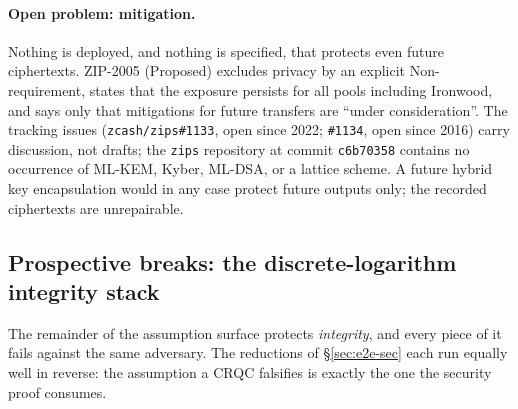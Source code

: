 \documentclass[11pt,a4paper]{article}
\theoremstyle{definition}
\begin{document}
\paragraph{Open problem: mitigation.} Nothing is deployed, and nothing is
specified, that protects even future ciphertexts. ZIP-2005 (Proposed) excludes
privacy by an explicit Non-requirement, states that the exposure persists for
all pools including Ironwood, and says only that mitigations for future
transfers are ``under consideration''. The tracking issues
(\texttt{zcash/zips\#1133}, open since 2022; \texttt{\#1134}, open since 2016)
carry discussion, not drafts; the \texttt{zips} repository at commit
\texttt{c6b70358} contains no occurrence of ML-KEM, Kyber, ML-DSA, or a
lattice scheme. A future hybrid key encapsulation would in any case protect
future outputs only; the recorded ciphertexts are unrepairable.

\subsection{Prospective breaks: the discrete-logarithm integrity
stack}\label{sec:pq-integrity}

The remainder of the assumption surface protects \emph{integrity}, and every
piece of it fails against the same adversary. The reductions of
\S\ref{sec:e2e-sec} each run equally well in reverse: the assumption a CRQC
falsifies is exactly the one the security proof consumes.
\end{document}
